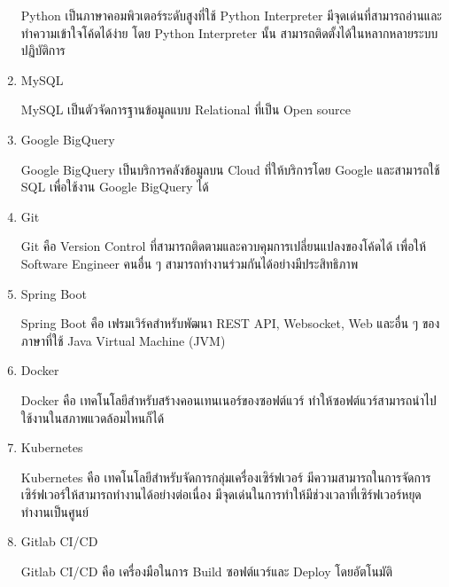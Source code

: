 \begin{enumerate}
	Python เป็นภาษาคอมพิวเตอร์ระดับสูงที่ใช้ Python Interpreter มีจุดเด่นที่สามารถอ่านและทำความเข้าใจโค้ดได้ง่าย โดย Python Interpreter นั้น สามารถติดตั้งได้ในหลากหลายระบบปฏิบัติการ  ~\cite{python}	
	\item MySQL
	
	MySQL เป็นตัวจัดการฐานข้อมูลแบบ Relational ที่เป็น Open source ~\cite{mysql}
	\item Google BigQuery
	
	Google BigQuery เป็นบริการคลังข้อมูลบน Cloud ที่ให้บริการโดย Google และสามารถใช้ SQL เพื่อใช้งาน Google BigQuery ได้ ~\cite{bigquery}
	\item Git
	
	Git คือ Version Control ที่สามารถติดตามและควบคุมการเปลี่ยนแปลงของโค้ดได้ เพื่อให้ Software Engineer คนอื่น ๆ สามารถทำงานร่วมกันได้อย่างมีประสิทธิภาพ ~\cite{git}
	\item Spring Boot
	
	Spring Boot คือ เฟรมเวิร์คสำหรับพัฒนา REST API, Websocket, Web และอื่น ๆ ของภาษาที่ใช้ Java Virtual Machine (JVM) ~\cite{spring}
	\item Docker
	
	Docker คือ เทคโนโลยีสำหรับสร้างคอนเทนเนอร์ของซอฟต์แวร์ ทำให้ซอฟต์แวร์สามารถนำไปใช้งานในสภาพแวดล้อมไหนก็ได้ ~\cite{docker}
	\item Kubernetes

	Kubernetes คือ เทคโนโลยีสำหรับจัดการกลุ่มเครื่องเซิร์ฟเวอร์ มีความสามารถในการจัดการเซิร์ฟเวอร์ให้สามารถทำงานได้อย่างต่อเนื่อง มีจุดเด่นในการทำให้มีช่วงเวลาที่เซิร์ฟเวอร์หยุดทำงานเป็นศูนย์ ~\cite{kubernetes}
	\item Gitlab CI/CD
	
	Gitlab CI/CD คือ เครื่องมือในการ Build ซอฟต์แวร์และ Deploy โดยอัตโนมัติ ~\cite{gitlabcicd}
\end{enumerate}

